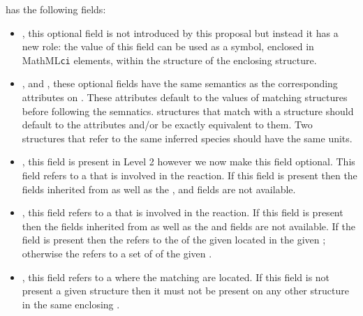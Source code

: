 \documentclass{cekarticle}
\begin{document}
 has the following fields:

\begin{itemize}

\item {}, this optional  field is not introduced by this proposal but instead
it has a new role: the value of this field can be used as a symbol, enclosed in MathML\texttt{ci}
elements, within the  structure of the enclosing  structure.

\item {},  and ,
these optional fields have the same semantics as the corresponding attributes on .
These attributes default to the values of matching  structures before following the
 semnatics.
 structures that match with a  structure should
default to the  attributes and/or be exactly equivalent to them.  Two 
 structures that refer to the same inferred species should have
the same units.

\item {}, this  field is present in Level 2 however we now make this field
optional.  This field refers to a  that is involved in the reaction.  If this field is
present then the fields inherited from  as well as the ,
 and  fields are not available.

\item {}, this  field refers to a  that is
involved in the reaction.  If this field is
present then the fields inherited from  as well as the 
 and  fields are not available.  If the 
field is present then the  refers to the  of
the given  located in the given ; otherwise the
 refers to a set of  of the given .

\item {}, this  field refers to a  where the matching
 are located.  If this field is not present a given 
structure then it must not be present on any other 
 structure in the same enclosing .

\end{itemize}
\end{document}
